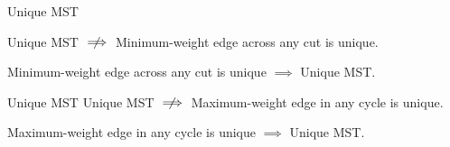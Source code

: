 \begin{frame}{}
  \begin{exampleblock}{Unique MST }
    \centerline{Unique MST $\centernot\implies$ Minimum-weight edge across any cut is unique.}
  \end{exampleblock}

  \pause

  \pause
  \begin{theorem}
    \centerline{Minimum-weight edge across any cut is unique $\implies$ Unique MST.}
  \end{theorem}
\end{frame}

\begin{frame}{}
  \begin{exampleblock}{Unique MST }
    Unique MST $\centernot\implies$ Maximum-weight edge in any cycle is unique.
  \end{exampleblock}

  \pause

  \pause
  \begin{theorem}
    \centerline{Maximum-weight edge in any cycle is unique $\implies$ Unique MST.}
  \end{theorem}

\end{frame}

\begin{frame}{}

  \begin{columns}
  \end{columns}
\end{frame}

